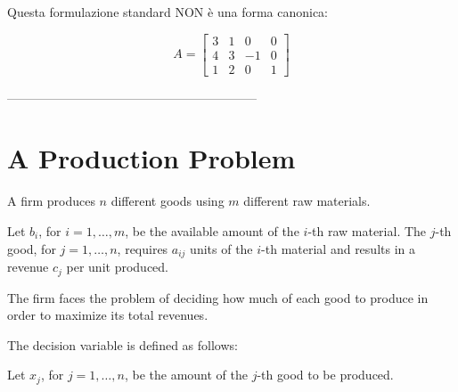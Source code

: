 \documentclass[a4paper, 11pt]{article}
\begin{document}
        Questa formulazione standard NON è una forma canonica:
        
        \[
            A = 
            \begin{bmatrix}
                3 & 1 & 0 & 0 \\
                4 & 3 & -1 & 0 \\
                1 & 2 & 0 & 1 
            \end{bmatrix}
        \]


        


    
    













































------------------------------------------------------------
\section{A Production Problem}

A firm produces $n$ different goods using $m$ different raw materials.

Let $b_{i}$, for $i = 1, \dots, m$, be the available amount of the $i$-th raw material. The $j$-th good, for $j = 1, \dots, n$, requires $a_{ij}$ units of the $i$-th material and results in a revenue $c_{j}$ per unit produced.

The firm faces the problem of deciding how much of each good to produce in order to maximize its total revenues.

The decision variable is defined as follows:

Let $x_{j}$, for $j = 1, \dots, n$, be the amount of the $j$-th good to be produced.
\end{document}
